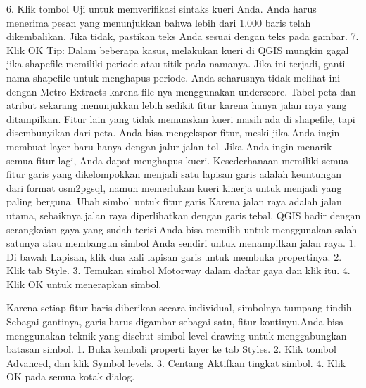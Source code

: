 6.	Klik tombol Uji untuk memverifikasi sintaks kueri Anda. Anda harus menerima pesan yang menunjukkan bahwa lebih dari 1.000 baris telah dikembalikan. Jika tidak, pastikan teks Anda sesuai dengan teks pada gambar.
7.	Klik OK
Tip: Dalam beberapa kasus, melakukan kueri di QGIS mungkin gagal jika shapefile memiliki periode atau titik pada namanya. Jika ini terjadi, ganti nama shapefile untuk menghapus periode. Anda seharusnya tidak melihat ini dengan Metro Extracts karena file-nya menggunakan underscore.
Tabel peta dan atribut sekarang menunjukkan lebih sedikit fitur karena hanya jalan raya yang ditampilkan. Fitur lain yang tidak memuaskan kueri masih ada di shapefile, tapi disembunyikan dari peta. Anda bisa mengekspor fitur, meski jika Anda ingin membuat layer baru hanya dengan jalur jalan tol. Jika Anda ingin menarik semua fitur lagi, Anda dapat menghapus kueri.
Kesederhanaan memiliki semua fitur garis yang dikelompokkan menjadi satu lapisan garis adalah keuntungan dari format osm2pgsql, namun memerlukan kueri kinerja untuk menjadi yang paling berguna.
Ubah simbol untuk fitur garis
Karena jalan raya adalah jalan utama, sebaiknya jalan raya diperlihatkan dengan garis tebal. QGIS hadir dengan serangkaian gaya yang sudah terisi.Anda bisa memilih untuk menggunakan salah satunya atau membangun simbol Anda sendiri untuk menampilkan jalan raya.
1.	Di bawah Lapisan, klik dua kali lapisan garis untuk membuka propertinya.
2.	Klik tab Style.
3.	Temukan simbol Motorway dalam daftar gaya dan klik itu.
4.	Klik OK untuk menerapkan simbol.
 
Karena setiap fitur baris diberikan secara individual, simbolnya tumpang tindih. Sebagai gantinya, garis harus digambar sebagai satu, fitur kontinyu.Anda bisa menggunakan teknik yang disebut simbol level drawing untuk menggabungkan batasan simbol.
1.	Buka kembali properti layer ke tab Styles.
2.	Klik tombol Advanced, dan klik Symbol levels.
3.	Centang Aktifkan tingkat simbol.
4.	Klik OK pada semua kotak dialog.
 
